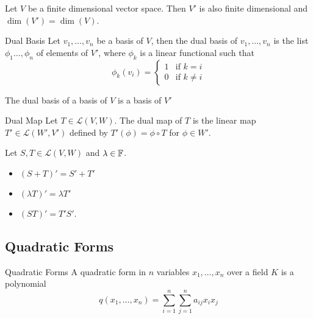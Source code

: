 \documentclass[a4paper]{article}
\begin{document}
\begin{lmm}{}{} Let $V$ be a finite dimensional vector space. Then $V'$ is also finite dimensional and $\dim(V')=\dim(V)$. 
\end{lmm}

\begin{defn}{Dual Basis}{} Let $v_1,\dots,v_n$ be a basis of $V$, then the dual basis of $v_1,\dots,v_n$ is the list $\phi_1\dots,\phi_n$ of elements of $V'$, where $\phi_k$ is a linear functional such that $$\phi_k(v_i)=
\begin{cases}
1 & \text{if }k=i\\
0 & \text{if }k\neq i
\end{cases}$$
\end{defn}

\begin{prp}{}{} The dual basis of a basis of $V$ is a basis of $V'$
\end{prp}

\begin{defn}{Dual Map}{} Let $T\in\mathcal{L}(V,W)$. The dual map of $T$ is the linear map $T'\in\mathcal{L}(W',V')$ defined by $T'(\phi)=\phi\circ T$ for $\phi\in W'$. 
\end{defn}

\begin{prp}{}{} Let $S,T\in\mathcal{L}(V,W)$ and $\lambda\in\mathbb{F}$. 
\begin{itemize}
\item $(S+T)'=S'+T'$
\item $(\lambda T)'=\lambda T'$
\item $(ST)'=T'S'$. 
\end{itemize}
\end{prp}

\subsection{Quadratic Forms}
\begin{defn}{Quadratic Forms}{} A quadratic form in $n$ variables $x_1,\dots,x_n$ over a field $K$ is a polynomial $$q(x_1,\dots,x_n)=\sum_{i=1}^n\sum_{j=1}^na_{ij}x_ix_j$$
\end{defn}
\end{document}
